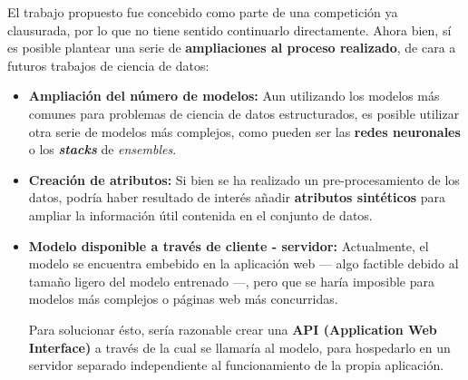El trabajo propuesto fue concebido como parte de una competición ya clausurada, por lo que no tiene sentido continuarlo directamente. Ahora bien, sí es posible plantear una serie de \textbf{ampliaciones al proceso realizado}, de cara a futuros trabajos de ciencia de datos:
\begin{itemize}[parsep=2pt, itemsep=2pt, topsep=4pt]
	\item \textbf{Ampliación del número de modelos:} Aun utilizando los modelos más comunes para problemas de ciencia de datos estructurados, es posible utilizar otra serie de modelos más complejos, como pueden ser las \textbf{redes neuronales} o los \textbf{\textit{stacks}} de \textit{ensembles}.
	\item \textbf{Creación de atributos:} Si bien se ha realizado un pre-procesamiento de los datos, podría haber resultado de interés añadir \textbf{atributos sintéticos} para ampliar la información útil contenida en el conjunto de datos.
	\item \textbf{Modelo disponible a través de cliente - servidor:} Actualmente, el modelo se encuentra embebido en la aplicación web --- algo factible debido al tamaño ligero del modelo entrenado ---, pero que se haría imposible para modelos más complejos o páginas web más concurridas.
	
	Para solucionar ésto, sería razonable crear una \textbf{API (Application Web Interface)} a través de la cual se llamaría al modelo, para hospedarlo en un servidor separado independiente al funcionamiento de la propia aplicación.
\end{itemize}